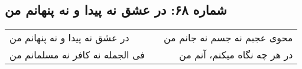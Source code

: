 \begin{center}
\section*{شماره ۶۸: در عشق نه پیدا و نه پنهانم من}
\label{sec:068}
\begin{longtable}{l p{0.5cm} r}
در عشق نه پیدا و نه پنهانم من
&&
محوی عجبم نه جسم نه جانم من
\\
فی الجمله نه کافر نه مسلمانم من
&&
در هر چه نگاه میکنم، آنم من
\\
\end{longtable}
\end{center}

